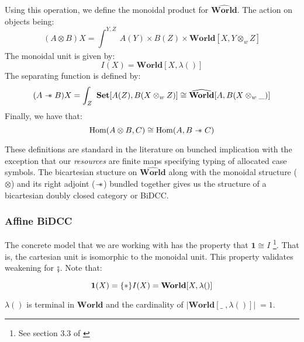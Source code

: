 \documentclass{article}
\newcommand{\sep}{\mathrel{-\mkern-6mu*}}
\newcommand{\pworld}{\widehat{\mathbf{World}}}
\newcommand{\world}{{\mathbf{World}}}
\begin{document}
Using this operation, we define the monoidal product for $\pworld$. The action on objects being: 
\[
(A \otimes B) X = \int_{}^{Y,Z}\ A(Y) \times B(Z) \times \world[X,Y \otimes_w Z]
\]
The monoidal unit is given by: 
\[ 
    I(X) = \mathbf{World}[X , \lambda()]
\]
The separating function is defined by: 
\[
(A \sep B) X = \int_{Z}^{}\ \mathbf{Set}[A(Z), B(X \otimes_w Z)] \cong \pworld[A, B(X\otimes_w\_)]
\]
Finally, we have that:
\[
\textrm{Hom}(A \otimes B , C) \cong \textrm{Hom}(A , B \sep C) 
\]

These definitions are standard in the literature on bunched implication with the 
exception that our \textit{resources} are finite maps specifying typing of allocated
case symbols. The bicartesian stucture on $\pworld$ along with 
the monoidal structure ($\otimes$) and its right adjoint ($\sep$) bundled together 
gives us the structure of a bicartesian doubly closed category or BiDCC. 

\subsubsection{Affine BiDCC}
The concrete model that we are working with has the property 
that $\mathbf{1} \cong I$ \footnote{See section 3.3 of \cite{pym_semantics_2002}}. 
That is, the cartesian unit is isomorphic to the monoidal unit. 
This property validates weakening for $\fatsemi$. Note that:

\[ 
    \mathbf{1}(X) = \{*\} \\
    I(X) = \world[X , \lambda()]
\]

$\lambda()$ is terminal in $\world$ and the cardinality of $|\world[\_\;,\lambda()]| \;= 1$.
\\
\end{document}
